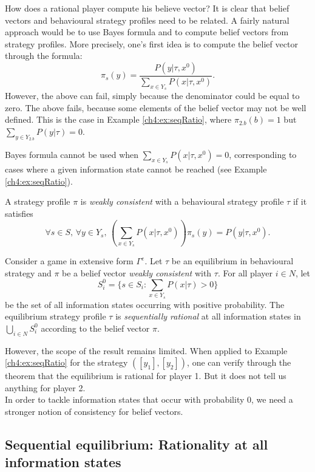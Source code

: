 How does a rational player compute his believe vector?
It is clear that belief vectors and behavioural strategy profiles need to be related. A fairly natural approach  would be to use Bayes formula and to compute belief vectors from strategy profiles. 
More precisely, one's first idea is to compute the belief vector through the formula:
$$ \pi_s(y) = \frac{P(y | \tau, x^0)}{\sum_{x \in Y_s} P(x | \tau, x^0)}. $$
However, the above can fail, simply because the denominator could be equal to zero. The above fails, because some elements of the belief vector may not be well defined. This is the case in Example \ref{ch4:ex:seqRatio}, where $\pi_{2.b}(b) = 1$ but  $ \sum_{y \in Y_{2.b}} P(y | \tau) = 0$. 

Bayes formula cannot be used when $\sum_{x \in Y_s} P(x | \tau, x^0) = 0$, corresponding to cases where a given information state cannot be reached (see Example \ref{ch4:ex:seqRatio}). 

\begin{definition}
A strategy profile $\pi$ is \emph{weakly consistent} with a behavioural strategy profile $\tau$  if it
satisfies 
$$\forall s \in S, \, \forall y \in Y_s, \, \left (\sum_{x \in Y_s} P(x | \tau, x^0)\right ) \pi_s(y) =  P(y | \tau, x^0).$$
\end{definition}

\begin{theorem}
Consider a game in extensive form $\Gamma^e$. Let $\tau$ be an equilibrium in behavioural strategy and $\pi$ be a belief vector \emph{weakly consistent} with $\tau$. 
For all player $i \in N$, let 
$$
S^0_i = \{s \in S_i : \sum_{x \in Y_s} P(x| \tau) > 0\}
$$ 
be the set of all information states occurring with positive probability.
The equilibrium strategy profile $\tau$ is \emph{sequentially rational} at all information states in $\bigcup_{i \in N} S^0_i$ according to the belief vector $\pi$.
\label{ch4:th:WeakRatio}
\end{theorem}

However, the scope of the result remains limited. When applied to Example \ref{ch4:ex:seqRatio} for the strategy $([y_1],[y_2])$, one can verify through the theorem that the equilibrium is rational for player 1. But it does not tell us anything for player 2.\\
In order to tackle information states that occur with probability 0, we need a stronger notion of consistency for belief vectors.

\subsection{Sequential equilibrium: Rationality at all information states}

